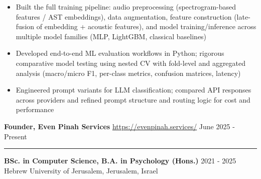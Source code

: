\documentclass[10.5pt]{article}
\newcommand{\cvsection}[1]{
    \vspace{0.1in}
    \noindent{\large \textbf{#1}}
    \vspace{0.02in}
    \hrule
    \vspace{0.04in}
}
\begin{document}
\begin{itemize}[topsep=2pt, itemsep=2pt]
    \item Built the full training pipeline: audio preprocessing (spectrogram-based features / AST embeddings), data augmentation, feature construction (late-fusion of embedding + acoustic features), and model training/inference across multiple model families (MLP, LightGBM, classical baselines)
    \item Developed end-to-end ML evaluation workflows in Python; rigorous comparative model testing using nested CV with fold-level and aggregated analysis (macro/micro F1, per-class metrics, confusion matrices, latency)
    \item Engineered prompt variants for LLM classification; compared API responses across providers and refined prompt structure and routing logic for cost and performance
\end{itemize}

\vspace{0.3em}
\noindent\textbf{Founder, Even Pinah Services} \quad \href{https://evenpinah.services/}{https://evenpinah.services/} \hfill June 2025 - Present

\cvsection{Education}
\noindent\textbf{BSc. in Computer Science, B.A. in Psychology (Hons.)} \hfill 2021 - 2025\\
Hebrew University of Jerusalem, Jerusalem, Israel
\end{document}

